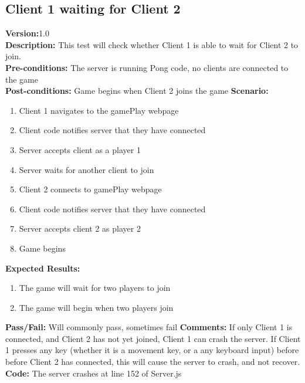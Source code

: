 \documentclass[12pt]{article}
\begin{document}
\subsection{Client 1 waiting for Client 2}
\textbf{Version:}1.0\\
\textbf{Description:} This test will check whether Client 1 is able to wait for Client 2 to join. \\
\textbf{Pre-conditions:} The server is running Pong code, no clients are connected to the game\\
\textbf{Post-conditions:} Game begins when Client 2 joins the game
\textbf{Scenario:}
\begin{enumerate}
    \item Client 1 navigates to the gamePlay webpage
    \item Client code notifies server that they have connected
    \item Server accepts client as a player 1
    \item Server waits for another client to join
    \item Client 2 connects to gamePlay webpage
    \item Client code notifies server that they have connected
    \item Server accepts client 2 as player 2
    \item Game begins
\end{enumerate}
\textbf{Expected Results:}
\begin{enumerate}
    \item The game will wait for two players to join
    \item The game will begin when two players join
\end{enumerate}
\textbf{Pass/Fail:} Will commonly pass, sometimes fail
\textbf{Comments:} If only Client 1 is connected, and Client 2 has not yet joined, Client 1 can crash the server. If Client 1 presses any key (whether it is a movement key, or a any keyboard input) before before Client 2 has connected, this will cause the server to crash, and not recover.
\textbf{Code:} The server crashes at line 152 of Server.js
\end{document}
